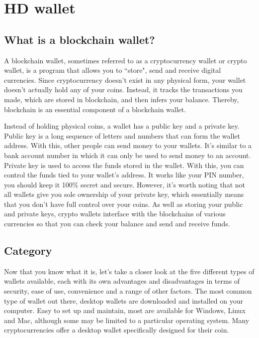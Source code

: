 \section{HD wallet}
\label{HD wallet}

\subsection{What is a blockchain wallet?}

A blockchain wallet, sometimes referred to as a cryptocurrency wallet or crypto wallet, is a program that allows you to ``store", send and receive digital currencies. Since cryptocurrency doesn’t exist in any physical form, your wallet doesn't actually hold any of your coins. Instead, it tracks the transactions you made, which are stored in blockchain, and then infers your balance. Thereby, blockchain is an essential component of a blockchain wallet.

Instead of holding physical coins, a wallet has a public key and a private key. Public key is a long sequence of letters and numbers that can form the wallet address. With this, other people can send money to your wallets. It’s similar to a bank account number in which it can only be used to send money to an account. Private key is used to access the funds stored in the wallet. With this, you can control the funds tied to your wallet’s address. It works like your PIN number, you should keep it 100\% secret and secure. However, it’s worth noting that not all wallets give you sole ownership of your private key, which essentially means that you don’t have full control over your coins. As well as storing your public and private keys, crypto wallets interface with the blockchains of various currencies so that you can check your balance and send and receive funds.

\subsection{Category}

Now that you know what it is, let’s take a closer look at the five different types of wallets available, each with its own advantages and disadvantages in terms of security, ease of use, convenience and a range of other factors. The most common type of wallet out there, desktop wallets are downloaded and installed on your computer. Easy to set up and maintain, most are available for Windows, Linux and Mac, although some may be limited to a particular operating system. Many cryptocurrencies offer a desktop wallet specifically designed for their coin.

